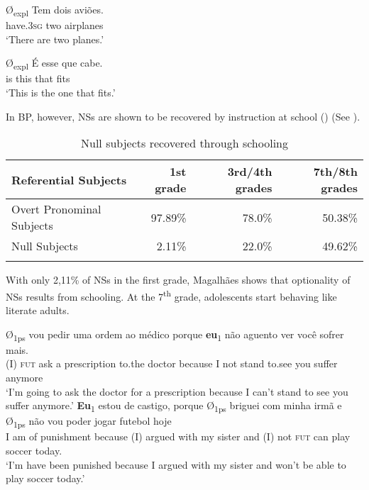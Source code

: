\documentclass[output=paper,colorlinks,citecolor=brown]{langscibook}
\begin{document}
\ea\label{ex:03:kato:16} %
   \ea\label{ex:03:kato:16a}
 \gll Ø\textsubscript{expl} Tem     dois aviões. \\
                  {}  have.3\textsc{sg} two airplanes	\\
          \glt ‘There are two planes.’

   \ex\label{ex:03:kato:16b}
 \gll  Ø\textsubscript{expl} É esse que cabe.\\
                      {}  is  this that fits	\\ 
                        \glt ‘This is the one that fits.’ 
   \z
\z

In BP, however, NSs are shown to be recovered by instruction at school (\citealt{magalhaes_aprendendo_2000}) (See ).

\begin{table}
\caption{Null subjects recovered through schooling \citep{magalhaes_aprendendo_2000}}
\label{03:table2}
 \begin{tabularx}{\textwidth}{Qrrr}
  \lsptoprule
  Referential Subjects  & 1st grade & 3rd/4th grades & 7th/8th grades \\
  \midrule
        Overt Pronominal Subjects & 97.89\% & 78.0\% &50.38\%\\
        Null Subjects & 2.11\%&22.0\%&49.62\%\\
  \lspbottomrule
 \end{tabularx}
\end{table}

With only 2,11\% of NSs in the first grade, Magalhães shows that optionality of NSs results from schooling. At the 7\textsuperscript{th} grade, adolescents start behaving like literate adults.

\ea\label{ex:03:kato:17}%
   \ea\label{ex:03:kato:17a}
 \gll Ø\textsubscript{1ps} vou pedir uma ordem      ao      médico porque \textbf{eu}\textsubscript{1} não aguento ver você   sofrer   mais. \\
           (I)   \textsc{fut} ask a prescription to.the doctor because  I    not stand     to.see you  suffer  anymore	   \\ 
          \glt ‘I'm going to ask the doctor for a prescription because I can't stand to see  you suffer anymore.’ 
   \ex\label{ex:03:kato:17b}
 \gll \textbf{Eu}\textsubscript{1} estou de castigo,      porque Ø\textsubscript{1ps} briguei com minha irmã e    Ø\textsubscript{1ps}  não vou   poder jogar     futebol hoje\\
              I      am   of punishment because (I) argued with my sister   and  (I)    not \textsc{fut} can play  soccer today.	\\ 
          \glt ‘I'm have been punished because I argued with my sister and won't be able to play soccer today.’ 
\end{document}
